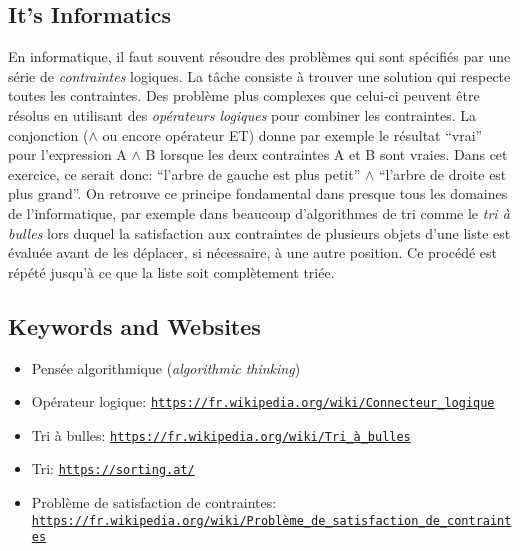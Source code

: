 \documentclass[a4paper,11pt]{report}
\newcommand{\BrochureUrlText}[1]{\texttt{#1}}
\begin{document}
\subsection*{It’s Informatics}

En informatique, il faut souvent résoudre des problèmes qui sont spécifiés par une série de \emph{contraintes} logiques. La tâche consiste à trouver une solution qui respecte toutes les contraintes. Des problème plus complexes que celui-ci peuvent être résolus en utilisant des \emph{opérateurs logiques} pour combiner les contraintes. La conjonction (${\wedge}$ ou encore opérateur ET) donne par exemple le résultat “vrai” pour l’expression A ${\wedge}$ B lorsque les deux contraintes A et B sont vraies. Dans cet exercice, ce serait donc: “l’arbre de gauche est plus petit” ${\wedge}$ “l’arbre de droite est plus grand”. On retrouve ce principe fondamental dans presque tous les domaines de l’informatique, par exemple dans beaucoup d’algorithmes de tri comme le \emph{tri à bulles} lors duquel la satisfaction aux contraintes de plusieurs objets d’une liste est évaluée avant de les déplacer, si nécessaire, à une autre position. Ce procédé est répété jusqu’à ce que la liste soit complètement triée.

{\raggedright

\subsection*{Keywords and Websites}

\begin{itemize}
  \item Pensée algorithmique (\emph{algorithmic thinking})
  \item Opérateur logique: \href{https://fr.wikipedia.org/wiki/Connecteur_logique}{\BrochureUrlText{https://fr.wikipedia.org/wiki/Connecteur\_logique}}
  \item Tri à bulles: \href{https://fr.wikipedia.org/wiki/Tri_\%C3\%A0_bulles}{\BrochureUrlText{https://fr.wikipedia.org/wiki/Tri\_à\_bulles}}
  \item Tri: \href{https://sorting.at/}{\BrochureUrlText{https://sorting.at/}}
  \item Problème de satisfaction de contraintes: \href{https://fr.wikipedia.org/wiki/Probl\%C3\%A8me_de_satisfaction_de_contraintes}{\BrochureUrlText{https://fr.wikipedia.org/wiki/Problème\_de\_satisfaction\_de\_contraintes}}
\end{itemize}


}
\end{document}
